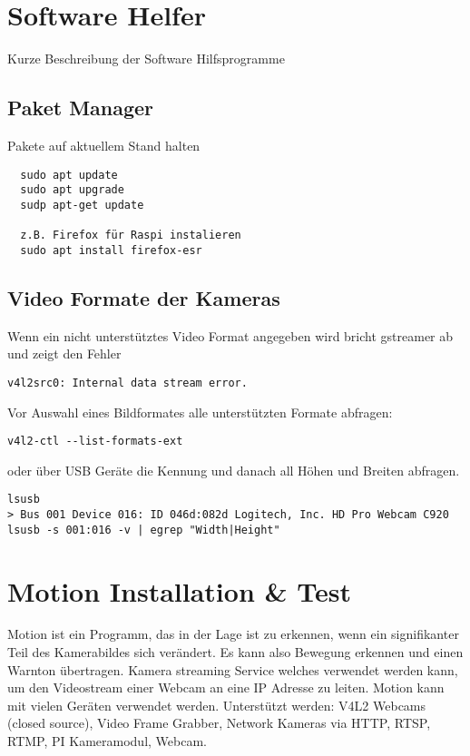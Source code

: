 \section{Software Helfer}
Kurze Beschreibung der Software Hilfsprogramme

\subsection{Paket Manager}
Pakete auf aktuellem Stand halten
\begin{verbatim}
  sudo apt update
  sudo apt upgrade
  sudp apt-get update

  z.B. Firefox für Raspi instalieren
  sudo apt install firefox-esr
\end{verbatim}

\subsection{Video Formate der Kameras}
Wenn ein nicht unterstütztes Video Format angegeben wird bricht gstreamer ab und zeigt den Fehler
\begin{verbatim}
v4l2src0: Internal data stream error.
\end{verbatim}

Vor Auswahl eines Bildformates alle unterstützten Formate 
abfragen:
\begin{verbatim}
v4l2-ctl --list-formats-ext
\end{verbatim}

oder über USB Geräte die Kennung und danach all Höhen und Breiten abfragen.
\begin{verbatim}
lsusb
> Bus 001 Device 016: ID 046d:082d Logitech, Inc. HD Pro Webcam C920
lsusb -s 001:016 -v | egrep "Width|Height"
\end{verbatim}

\section{Motion Installation \& Test}

Motion ist ein Programm, das in der Lage ist zu erkennen, wenn ein signifikanter Teil des Kamerabildes sich verändert. Es kann also Bewegung erkennen und einen Warnton übertragen. Kamera streaming Service welches verwendet werden kann, um den Videostream einer Webcam an eine IP Adresse zu leiten. Motion kann mit vielen Geräten verwendet werden. Unterstützt werden: V4L2 Webcams (closed source), Video Frame Grabber, Network Kameras via HTTP, RTSP, RTMP, PI Kameramodul, Webcam.\\

